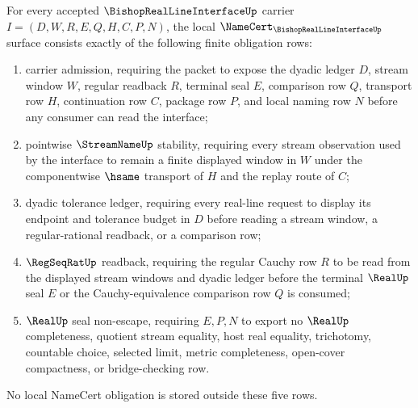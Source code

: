 \begin{theorem}
\label{thm:bishop-real-line-interface-namecert-obligations}
For every accepted $\BishopRealLineInterfaceUp$ carrier $I=(D,W,R,E,Q,H,C,P,N)$, the local $\NameCert_{\BishopRealLineInterfaceUp}$ surface consists exactly of the following finite obligation rows:
\begin{enumerate}
\item carrier admission, requiring the packet to expose the dyadic ledger $D$, stream window $W$, regular readback $R$, terminal seal $E$, comparison row $Q$, transport row $H$, continuation row $C$, package row $P$, and local naming row $N$ before any consumer can read the interface;
\item pointwise $\StreamNameUp$ stability, requiring every stream observation used by the interface to remain a finite displayed window in $W$ under the componentwise $\hsame$ transport of $H$ and the replay route of $C$;
\item dyadic tolerance ledger, requiring every real-line request to display its endpoint and tolerance budget in $D$ before reading a stream window, a regular-rational readback, or a comparison row;
\item $\RegSeqRatUp$ readback, requiring the regular Cauchy row $R$ to be read from the displayed stream windows and dyadic ledger before the terminal $\RealUp$ seal $E$ or the Cauchy-equivalence comparison row $Q$ is consumed;
\item $\RealUp$ seal non-escape, requiring $E,P,N$ to export no $\RealUp$ completeness, quotient stream equality, host real equality, trichotomy, countable choice, selected limit, metric completeness, open-cover compactness, or bridge-checking row.
\end{enumerate}
No local NameCert obligation is stored outside these five rows.
\end{theorem}
